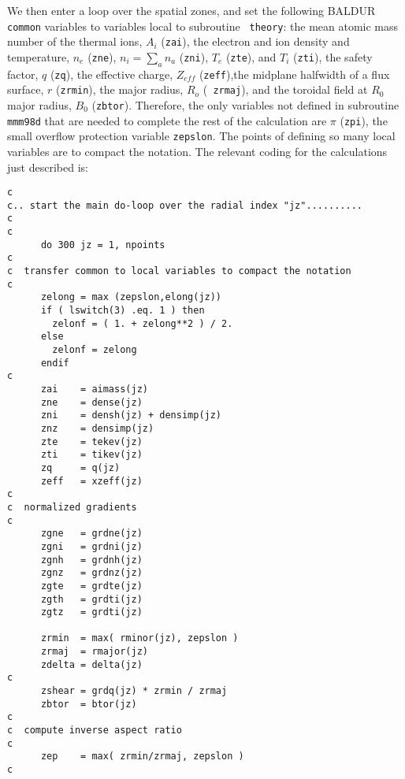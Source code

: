 We then enter a loop over the spatial zones, and set the following
BALDUR {\tt common} variables to variables local to subroutine {\tt
theory}: the mean atomic mass number of the thermal ions, $A_{i}$
({\tt zai}), the electron and ion density and temperature, $n_{e}$
({\tt zne}), $n_{i}=\sum_{a}n_{a}$ ({\tt zni}), $T_{e}$ ({\tt zte}),
and $T_{i}$ ({\tt zti}), the safety factor, $q$ ({\tt zq}), the
effective charge, $Z_{eff}$ ({\tt zeff}),the midplane halfwidth of a
flux surface, $r$ ({\tt zrmin}), the major radius, $R_{o}$ ({\tt
zrmaj}), and the toroidal field at $R_0$ major radius, $B_{0}$
({\tt zbtor}).  Therefore, the only variables not defined in
subroutine {\tt mmm98d} that are needed to complete the rest of the
calculation are $\pi$ ({\tt zpi}), the small overflow protection
variable {\tt zepslon}.  The points of defining so many local
variables are to compact the notation.  The relevant coding for the
calculations just described is:

\begin{verbatim}
c
c.. start the main do-loop over the radial index "jz"..........
c
c
      do 300 jz = 1, npoints
c
c  transfer common to local variables to compact the notation
c
      zelong = max (zepslon,elong(jz))
      if ( lswitch(3) .eq. 1 ) then
        zelonf = ( 1. + zelong**2 ) / 2.
      else
        zelonf = zelong
      endif
c
      zai    = aimass(jz)
      zne    = dense(jz)
      zni    = densh(jz) + densimp(jz)
      znz    = densimp(jz)
      zte    = tekev(jz)
      zti    = tikev(jz)
      zq     = q(jz)
      zeff   = xzeff(jz)
c
c  normalized gradients
c
      zgne   = grdne(jz)
      zgni   = grdni(jz)
      zgnh   = grdnh(jz)
      zgnz   = grdnz(jz)
      zgte   = grdte(jz)
      zgth   = grdti(jz)
      zgtz   = grdti(jz)

      zrmin  = max( rminor(jz), zepslon )
      zrmaj  = rmajor(jz)
      zdelta = delta(jz)
c
      zshear = grdq(jz) * zrmin / zrmaj
      zbtor  = btor(jz)
c
c  compute inverse aspect ratio
c
      zep    = max( zrmin/zrmaj, zepslon )
c
\end{verbatim}

